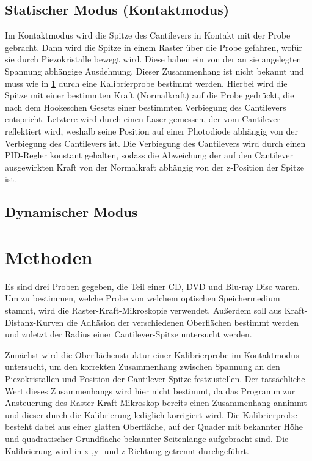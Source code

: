 \documentclass[
	a4paper,
	12pt,
	pagesize,
	ngerman
]{scrartcl}
\begin{document}
	\subsection{Statischer Modus (Kontaktmodus)}
	Im Kontaktmodus wird die Spitze des Cantilevers in Kontakt mit der Probe gebracht.
	Dann wird die Spitze in einem Raster über die Probe gefahren, wofür sie durch Piezokristalle bewegt wird.
	Diese haben ein von der an sie angelegten Spannung abhängige Ausdehnung.
	Dieser Zusammenhang ist nicht bekannt und muss wie in \cref{sec_methoden} durch eine Kalibrierprobe bestimmt werden.
	Hierbei wird die Spitze mit einer bestimmten Kraft (Normalkraft) auf die Probe gedrückt, die nach dem Hookeschen Gesetz einer bestimmten Verbiegung des Cantilevers entspricht.
	Letztere wird durch einen Laser gemessen, der vom Cantilever  reflektiert wird, weshalb seine Position auf einer Photodiode abhängig von der Verbiegung des Cantilevers ist.%
	Die Verbiegung des Cantilevers wird durch einen PID-Regler konstant gehalten, sodass die Abweichung der auf den Cantilever ausgewirkten Kraft von der Normalkraft abhängig von der z-Position der Spitze ist. %

	\subsection{Dynamischer Modus}

	\section{Methoden}
	\label{sec_methoden}
	Es sind drei Proben gegeben, die Teil einer CD, DVD und Blu-ray Disc waren.
	Um zu bestimmen, welche Probe von welchem optischen Speichermedium stammt, wird die Raster-Kraft-Mikroskopie verwendet.
	Außerdem soll aus Kraft-Distanz-Kurven die Adhäsion der verschiedenen Oberflächen bestimmt werden und zuletzt der Radius einer Cantilever-Spitze untersucht werden. %

	Zunächst wird die Oberflächenstruktur einer Kalibrierprobe im Kontaktmodus untersucht, um den korrekten Zusammenhang zwischen Spannung an den Piezokristallen und Position der Cantilever-Spitze festzustellen.
	Der tatsächliche Wert dieses Zusammenhangs wird hier nicht bestimmt, da das Programm zur Ansteuerung des Raster-Kraft-Mikroskop bereits einen Zusammenhang annimmt und dieser durch die Kalibrierung lediglich korrigiert wird.
	Die Kalibrierprobe besteht dabei aus einer glatten Oberfläche, auf der Quader mit bekannter Höhe und quadratischer Grundfläche bekannter Seitenlänge aufgebracht sind.
	Die Kalibrierung wird in x-,y- und z-Richtung getrennt durchgeführt.
\end{document}
